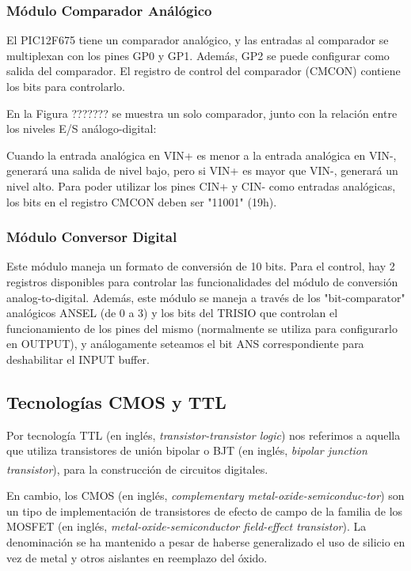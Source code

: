 \documentclass[a4paper]{article}
\let\originalcite\cite
\renewcommand{\cite}[2][]{\textsuperscript{\originalcite{#2}}}
\begin{document}
\subsubsection*{Módulo Comparador Análógico}

El PIC12F675 tiene un comparador analógico, y las entradas al
comparador se multiplexan con los pines GP0 y GP1.
Además, GP2 se puede configurar como salida del comparador.
El registro de control del comparador (CMCON) contiene
los bits para controlarlo.
	
En la Figura ??????? se muestra un solo comparador, junto con
la relación entre los niveles E/S análogo-digital:
		
Cuando la entrada analógica en VIN+ es menor a la entrada
analógica en VIN-, generará una salida de nivel bajo, pero si VIN+
es mayor que VIN-, generará un nivel alto.
Para poder utilizar los pines CIN+ y CIN- como entradas analógicas,
los bits en el registro CMCON deben ser "11001" (19h).
		
\subsubsection*{Módulo Conversor Digital}

Este módulo maneja un formato de conversión de 10 bits. Para el control,
hay 2 registros disponibles para controlar las funcionalidades
del módulo de conversión analog-to-digital.
Además, este módulo se maneja a través de los "bit-comparator" analógicos
ANSEL (de 0 a 3) y los bits del TRISIO que controlan el funcionamiento
de los pines del mismo (normalmente se utiliza para configurarlo en OUTPUT),
y análogamente seteamos el bit ANS correspondiente para deshabilitar el INPUT buffer.
	
\subsection*{Tecnologías CMOS y TTL}

Por tecnología TTL (en inglés, \textit{transistor-transistor logic})
nos referimos a aquella que utiliza transistores de unión bipolar o 
BJT (en inglés, \textit{bipolar junction transistor}), para la 
construcción de circuitos digitales\cite{bib:boylestad}.

En cambio, los CMOS (en inglés, \textit{complementary 
metal-oxide-semiconduc-tor}) son un tipo de implementación de 
transistores de efecto de campo de la familia de los MOSFET (en 
inglés, \textit{metal-oxide-semiconductor field-effect transistor}). 
La denominación se ha mantenido a pesar de haberse generalizado el 
uso de silicio en vez de metal y otros aislantes en reemplazo del 
óxido.
\end{document}
